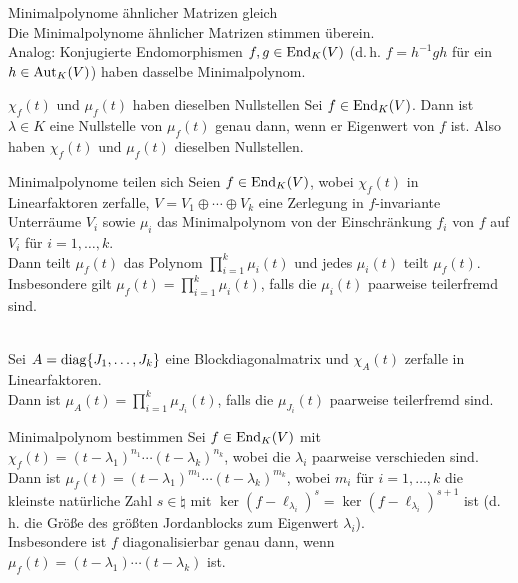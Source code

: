 \begin{Satz}{Minimalpolynome ähnlicher Matrizen gleich} \\
    Die Minimalpolynome ähnlicher Matrizen stimmen überein. \\
    Analog: Konjugierte Endomorphismen $f, g \in \operatorname{End}_K(V)$
    (d.\,h. $f = h^{-1} g h$ für ein $h \in \operatorname{Aut}_K(V)$)
    haben dasselbe Minimalpolynom.
\end{Satz}

\begin{Satz}{$\chi_f(t)$ und $\mu_f(t)$ haben dieselben Nullstellen}
    Sei $f \in \operatorname{End}_K(V)$.
    Dann ist $\lambda \in K$ eine Nullstelle von $\mu_f(t)$ genau dann,
    wenn er Eigenwert von $f$ ist.
    Also haben $\chi_f(t)$ und $\mu_f(t)$ dieselben Nullstellen.
\end{Satz}

\begin{Satz}{Minimalpolynome teilen sich}
    Seien $f \in \operatorname{End}_K(V)$, wobei $\chi_f(t)$ in Linearfaktoren zerfalle,
    $V = V_1 \oplus \dotsb \oplus V_k$ eine Zerlegung in $f$-invariante
    Unterräume $V_i$ sowie $\mu_i$ das Minimalpolynom von der
    Einschränkung $f_i$ von $f$ auf $V_i$ für $i = 1, \dotsc, k$. \\
    Dann teilt $\mu_f(t)$ das Polynom $\prod_{i=1}^k \mu_i(t)$ und jedes
    $\mu_i(t)$ teilt $\mu_f(t)$. \\
    Insbesondere gilt $\mu_f(t) = \prod_{i=1}^k \mu_i(t)$, falls die
    $\mu_i(t)$ paarweise teilerfremd sind.
\end{Satz}

\begin{Kor} \\
    Sei $A = \operatorname{diag}\{J_1, \dotsc, J_k\}$ eine Blockdiagonalmatrix und
    $\chi_A(t)$ zerfalle in Linearfaktoren. \\
    Dann ist $\mu_A(t) = \prod_{i=1}^k \mu_{J_i}(t)$,
    falls die $\mu_{J_i}(t)$ paarweise teilerfremd sind.
\end{Kor}

\begin{Satz}{Minimalpolynom bestimmen}
    Sei $f \in \operatorname{End}_K(V)$ mit
    $\chi_f(t) = (t - \lambda_1)^{n_1} \dotsm (t - \lambda_k)^{n_k}$,
    wobei die $\lambda_i$ paarweise verschieden sind. \\
    Dann ist $\mu_f(t) = (t - \lambda_1)^{m_1} \dotsm (t - \lambda_k)^{m_k}$,
    wobei $m_i$ für $i = 1, \dotsc, k$
    die kleinste natürliche Zahl $s \in \natural$ mit
    $\ker(f - \ell_{\lambda_i})^s = \ker(f - \ell_{\lambda_i})^{s+1}$ ist
    (d.\,h. die Größe des größten Jordanblocks zum Eigenwert $\lambda_i$). \\
    Insbesondere ist $f$ diagonalisierbar genau dann, wenn
    $\mu_f(t) = (t - \lambda_1) \dotsm (t - \lambda_k)$ ist.
\end{Satz}

\pagebreak
